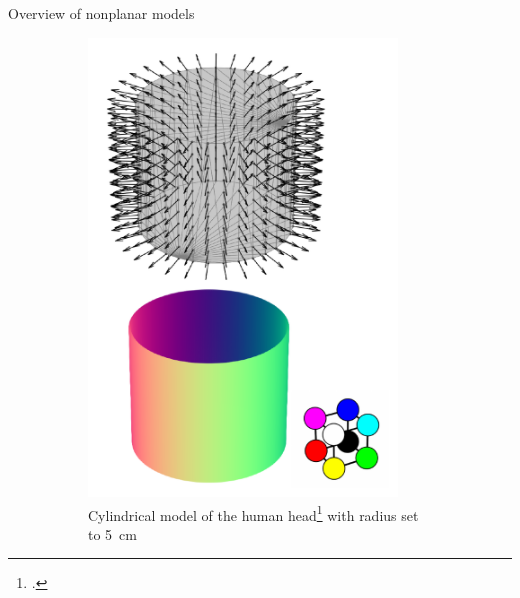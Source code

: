 \documentclass[xcolor=dvipsnames,10pt]{beamer}
\begin{document}
\begin{frame}{Overview of nonplanar models}
\begin{figure}
\begin{subfigure}[b]{0.31\textwidth}
         \includegraphics[width=0.9\textwidth]{artwork/canonical_tissue_model.cylinder.pdf}
         \caption{Cylindrical model of the human head\footcite{Kapetanovic2023Machine} with radius set to \SI{5}{\cm}}
     \end{subfigure}
     \hfill
     \begin{subfigure}[b]{0.31\textwidth}
         \centering

\end{subfigure}
\end{figure}
\end{frame}
\end{document}

